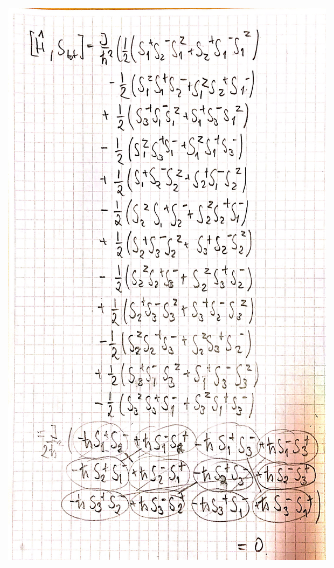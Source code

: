 \documentclass{article}
\begin{document}
\begin{appendix}
\begin{figure}[ht]
	\centering
	\includegraphics[width=0.75\textwidth]{figures/Problem1_5_2.jpg}
\end{figure}
\end{appendix}
\end{document}
